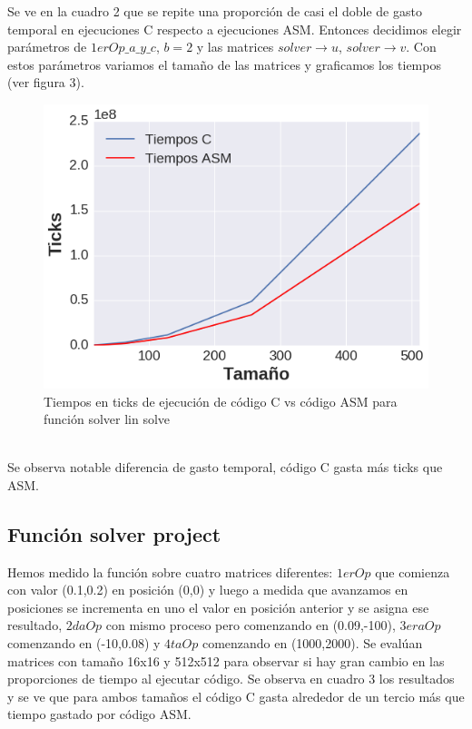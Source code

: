  Se ve en la cuadro 2 que se repite una proporción de casi el doble de gasto temporal en ejecuciones C respecto a ejecuciones ASM. Entonces decidimos elegir parámetros de $1erOp\_a\_y\_c$, $b = 2$ y las matrices $solver\rightarrow u$, $solver\rightarrow v$.
 Con estos parámetros variamos el tamaño de las matrices y graficamos los tiempos (ver figura 3).
\begin{figure}[h]

\centering
\includegraphics[scale=0.6] {solver_lin_solve}
  
 \caption{Tiempos en ticks de ejecución de código C vs código ASM para función solver lin solve}
\end{figure} \\
Se observa notable diferencia de gasto temporal, código C gasta más ticks que ASM.

\subsection{Función solver project}
Hemos medido la función sobre cuatro matrices diferentes: $1erOp$ que comienza con valor (0.1,0.2) en posición (0,0) y luego a medida que avanzamos en posiciones se incrementa en uno el valor en posición anterior y se asigna ese resultado, $2daOp$ con mismo proceso pero comenzando en (0.09,-100), $3eraOp$ comenzando en (-10,0.08) y $4taOp$ comenzando en (1000,2000). Se evalúan matrices con tamaño 16x16 y 512x512 para observar si hay gran cambio en las proporciones de tiempo al ejecutar código. Se observa en cuadro 3 los resultados y se ve que 
para ambos tamaños el código C gasta alrededor de un tercio más que tiempo gastado por código ASM. 
 

